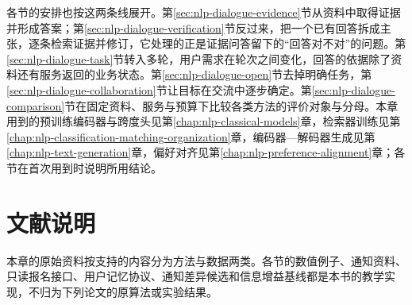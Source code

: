 各节的安排也按这两条线展开。第\ref{sec:nlp-dialogue-evidence}节从资料中取得证据并形成答案；第\ref{sec:nlp-dialogue-verification}节反过来，把一个已有回答拆成主张，逐条检索证据并修订，它处理的正是证据问答留下的“回答对不对”的问题。第\ref{sec:nlp-dialogue-task}节转入多轮，用户需求在轮次之间变化，回答的依据除了资料还有服务返回的业务状态。第\ref{sec:nlp-dialogue-open}节去掉明确任务，第\ref{sec:nlp-dialogue-collaboration}节让目标在交流中逐步确定。第\ref{sec:nlp-dialogue-comparison}节在固定资料、服务与预算下比较各类方法的评价对象与分母。本章用到的预训练编码器与跨度头见第\ref{chap:nlp-classical-models}章，检索器训练见第\ref{chap:nlp-classification-matching-organization}章，编码器—解码器生成见第\ref{chap:nlp-text-generation}章，偏好对齐见第\ref{chap:nlp-preference-alignment}章；各节在首次用到时说明所用结论。

\FloatBarrier







\section*{文献说明}
\label{sec:nlp-dialogue-literature}

本章的原始资料按支持的内容分为方法与数据两类。各节的数值例子、通知资料、只读报名接口、用户记忆协议、通知差异候选和信息增益基线都是本书的教学实现，不归为下列论文的原算法或实验结果。

